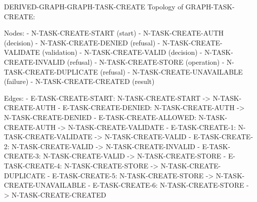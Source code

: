 \documentclass[11pt,a4paper]{article}
\begin{document}
\par\noindent\begin{minipage}{\linewidth}
\begin{atlasderived}{DERIVED-GRAPH-GRAPH-TASK-CREATE}
Topology of GRAPH-TASK-CREATE:

Nodes:
- N-TASK-CREATE-START (start)
- N-TASK-CREATE-AUTH (decision)
- N-TASK-CREATE-DENIED (refusal)
- N-TASK-CREATE-VALIDATE (validation)
- N-TASK-CREATE-VALID (decision)
- N-TASK-CREATE-INVALID (refusal)
- N-TASK-CREATE-STORE (operation)
- N-TASK-CREATE-DUPLICATE (refusal)
- N-TASK-CREATE-UNAVAILABLE (failure)
- N-TASK-CREATE-CREATED (result)

Edges:
- E-TASK-CREATE-START: N-TASK-CREATE-START -> N-TASK-CREATE-AUTH
- E-TASK-CREATE-DENIED: N-TASK-CREATE-AUTH -> N-TASK-CREATE-DENIED
- E-TASK-CREATE-ALLOWED: N-TASK-CREATE-AUTH -> N-TASK-CREATE-VALIDATE
- E-TASK-CREATE-1: N-TASK-CREATE-VALIDATE -> N-TASK-CREATE-VALID
- E-TASK-CREATE-2: N-TASK-CREATE-VALID -> N-TASK-CREATE-INVALID
- E-TASK-CREATE-3: N-TASK-CREATE-VALID -> N-TASK-CREATE-STORE
- E-TASK-CREATE-4: N-TASK-CREATE-STORE -> N-TASK-CREATE-DUPLICATE
- E-TASK-CREATE-5: N-TASK-CREATE-STORE -> N-TASK-CREATE-UNAVAILABLE
- E-TASK-CREATE-6: N-TASK-CREATE-STORE -> N-TASK-CREATE-CREATED
\end{atlasderived}
\end{minipage}\par
\clearpage
{}\par
{}\par
\end{document}
